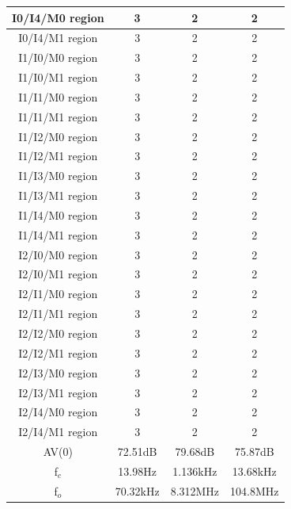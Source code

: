 \begin{longtable}{c|c|c|c|}
    \multicolumn{1}{|c|}{I0/I4/M0 region} & 3 & 2 & 2 \\ \hline
    \multicolumn{1}{|c|}{I0/I4/M1 region} & 3 & 2 & 2 \\ \hline
    \multicolumn{1}{|c|}{I1/I0/M0 region} & 3 & 2 & 2 \\ \hline
    \multicolumn{1}{|c|}{I1/I0/M1 region} & 3 & 2 & 2 \\ \hline
    \multicolumn{1}{|c|}{I1/I1/M0 region} & 3 & 2 & 2 \\ \hline
    \multicolumn{1}{|c|}{I1/I1/M1 region} & 3 & 2 & 2 \\ \hline
    \multicolumn{1}{|c|}{I1/I2/M0 region} & 3 & 2 & 2 \\ \hline
    \multicolumn{1}{|c|}{I1/I2/M1 region} & 3 & 2 & 2 \\ \hline
    \multicolumn{1}{|c|}{I1/I3/M0 region} & 3 & 2 & 2 \\ \hline
    \multicolumn{1}{|c|}{I1/I3/M1 region} & 3 & 2 & 2 \\ \hline
    \multicolumn{1}{|c|}{I1/I4/M0 region} & 3 & 2 & 2 \\ \hline
    \multicolumn{1}{|c|}{I1/I4/M1 region} & 3 & 2 & 2 \\ \hline
    \multicolumn{1}{|c|}{I2/I0/M0 region} & 3 & 2 & 2 \\ \hline
    \multicolumn{1}{|c|}{I2/I0/M1 region} & 3 & 2 & 2 \\ \hline
    \multicolumn{1}{|c|}{I2/I1/M0 region} & 3 & 2 & 2 \\ \hline
    \multicolumn{1}{|c|}{I2/I1/M1 region} & 3 & 2 & 2 \\ \hline
    \multicolumn{1}{|c|}{I2/I2/M0 region} & 3 & 2 & 2 \\ \hline
    \multicolumn{1}{|c|}{I2/I2/M1 region} & 3 & 2 & 2 \\ \hline
    \multicolumn{1}{|c|}{I2/I3/M0 region} & 3 & 2 & 2 \\ \hline
    \multicolumn{1}{|c|}{I2/I3/M1 region} & 3 & 2 & 2 \\ \hline
    \multicolumn{1}{|c|}{I2/I4/M0 region} & 3 & 2 & 2 \\ \hline
    \multicolumn{1}{|c|}{I2/I4/M1 region} & 3 & 2 & 2 \\ \hline
    \multicolumn{1}{|c|}{AV(0)} & 72.51dB & 79.68dB & 75.87dB \\ \hline
    \multicolumn{1}{|c|}{f$_c$} & 13.98Hz & 1.136kHz & 13.68kHz \\ \hline
    \multicolumn{1}{|c|}{f$_o$} & 70.32kHz & 8.312MHz & 104.8MHz \\ \hline
\end{longtable}


